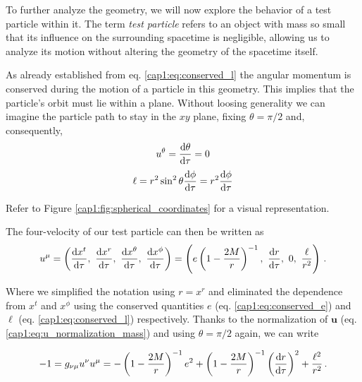 \begin{minipage}{0.57 \textwidth}
    To further analyze the \Sh geometry, we will now explore the behavior of a
    test particle within it.
    The term \textit{test particle} refers to an object with mass so small that
    its influence on the surrounding spacetime is negligible, allowing us to
    analyze its motion without altering the geometry of the spacetime itself.

    As already established from eq. \ref{cap1:eq:conserved_l} the angular
    momentum is conserved during the motion of a particle in this geometry.
    This implies that the particle's orbit must lie within a plane.
    Without loosing generality we can imagine the particle path to stay in the
    $xy$ plane, fixing $\theta = \pi / 2$ and, consequently,
    \begin{equation*}
        u^\theta = \dv{\theta}{\tau} = 0 
    \end{equation*}
    \begin{equation*}
        \ell = r^2 \sin^2 \theta \dv{\phi}{\tau} = r^2 \dv{\phi}{\tau}
    \end{equation*}

    Refer to Figure \ref{cap1:fig:spherical_coordinates} for a visual
    representation.
\end{minipage}
\hspace{0.02 \textwidth}

The four-velocity of our test particle can then be written as
\begin{equation*}
    u^\mu
    = \left(\dv{x^t}{\tau},~\dv{x^r}{\tau},~\dv{x^\theta}{\tau},~
    \dv{x^\phi}{\tau} \right)
    = \left(e \left(1 - \frac{2M}{r}\right)^{-1},~\dv{r}{\tau},~0,~
    \frac{\ell}{r^2} \right) \, .
\end{equation*}

Where we simplified the notation using $r = x^r$ and eliminated
the dependence from $x^t$ and $x^\phi$ using the conserved quantities $e$ (eq.
\ref{cap1:eq:conserved_e}) and $\ell$ (eq. \ref{cap1:eq:conserved_l})
respectively.
Thanks to the normalization of $\mathbf u$ (eq.
\ref{cap1:eq:u_normalization_mass}) and using $\theta = \pi / 2$ again, we can
write

\begin{equation*}
    - 1 = g_{\nu \mu} u^\nu u^\mu =
    - \left(1 - \frac{2M}{r} \right)^{-1} e^2
    + \left(1 - \frac{2M}{r} \right)^{- 1} \left(\dv{r}{\tau} \right)^2
    + \frac{\ell^2}{r^2} \, .
\end{equation*}

